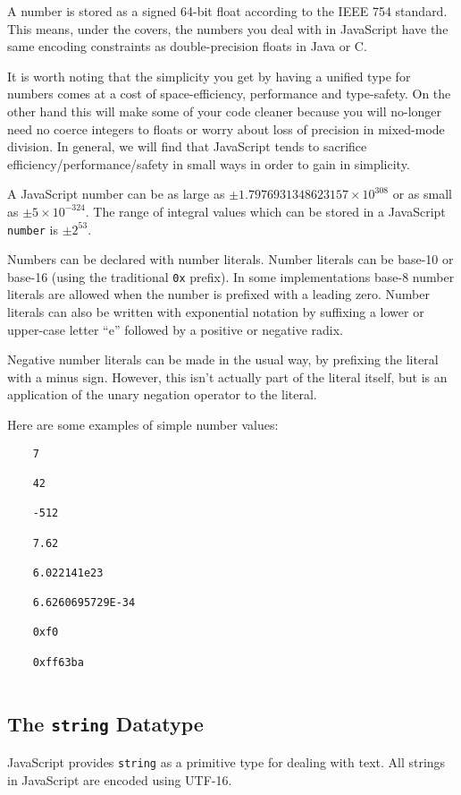 \documentclass[11pt,letter]{book}
\begin{document}
    A number is stored as a signed 64-bit float according to the IEEE 754 standard. This means, 
    under the covers, the numbers you deal with in JavaScript have the same encoding constraints as 
    double-precision floats in Java or C.
    
    It is worth noting that the simplicity you get by having a unified type for numbers comes at 
    a cost of space-efficiency, performance and type-safety. On the other hand this will make 
    some of your code cleaner because you will no-longer need no coerce integers to floats or 
    worry about loss of precision in mixed-mode division. In general, we will find that 
    JavaScript tends to sacrifice efficiency/performance/safety in small ways in order to gain 
    in simplicity.
    
    A JavaScript number can be as large as $\pm 1.7976931348623157 \times 10^{308}$ or as small as
    $\pm 5 \times 10^{-324}$. The range of integral values which can be stored in a JavaScript 
    \texttt{number} is $\pm 2^{53}$.
    
    Numbers can be declared with number literals. Number literals can be base-10 or base-16 (using 
    the traditional \texttt{0x} prefix). In some implementations base-8 number literals are allowed 
    when the number is prefixed with a leading zero. Number literals can also be written with 
    exponential notation by suffixing a lower or upper-case letter ``e'' followed by a positive or 
    negative radix. 
    
    Negative number literals can be made in the usual way, by prefixing the literal with a minus 
    sign. However, this isn't actually part of the literal itself, but is an application of the 
    unary negation operator to the literal.
    
    Here are some examples of simple number values:
    
    \begin{verbatim}
    7
    
    42
    
    -512
    
    7.62
    
    6.022141e23
    
    6.6260695729E-34
    
    0xf0
    
    0xff63ba
    
    \end{verbatim}
    
    \subsection{The \texttt{string} Datatype}
    JavaScript provides \texttt{string} as a primitive type for dealing with text. All strings in 
    JavaScript are encoded using UTF-16.
    
\end{document}
